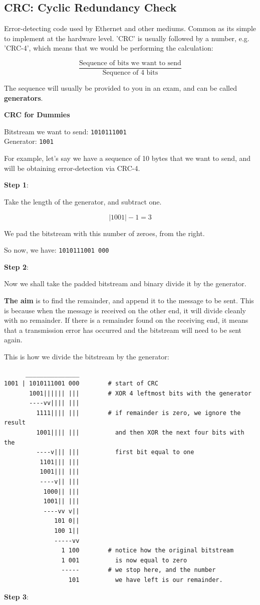 \documentclass{article}
\begin{document}
\subsection{CRC: Cyclic Redundancy Check}

Error-detecting code used by Ethernet and other mediums. Common as its simple to implement at the hardware level. 'CRC' is usually followed by a number, e.g. 'CRC-4', which means that we would be performing the calculation:

\[
\frac{\text{Sequence of bits we want to send}}{\text{Sequence of 4 bits}}
\]

The sequence will usually be provided to you in an exam, and can be called \textbf{generators}.

\newpage
\large\textbf{CRC for Dummies}

Bitstream we want to send: \texttt{1010111001}\\
Generator: \texttt{1001}

For example, let's say we have a sequence of 10 bytes that we want to send, and will be obtaining error-detection via CRC-4.

\textbf{Step 1}:

Take the length of the generator, and subtract one.

\[ |1001| - 1  = 3\]

We pad the bitstream with this number of zeroes, from the right.

So now, we have: \texttt{1010111001 000}

\textbf{Step 2}:

Now we shall take the padded bitstream and binary divide it by the generator.

\textbf{The aim} is to find the remainder, and append it to the message to be sent. This is because when the message
is received on the other end, it will divide cleanly with no remainder. If there is a remainder found on the receiving end, it means that a transmission error has occurred and the bitstream will need to be sent again.

This is how we divide the bitstream by the generator:

\begin{lstlisting}
      _______________
1001 | 1010111001 000        # start of CRC
       1001|||||| |||        # XOR 4 leftmost bits with the generator
       ----vv|||| |||         
         1111|||| |||        # if remainder is zero, we ignore the result
         1001|||| |||          and then XOR the next four bits with the 
         ----v||| |||          first bit equal to one
          1101||| |||
          1001||| |||
          ----v|| |||
           1000|| |||
           1001|| |||
           ----vv v||
              101 0||
              100 1||
              -----vv
                1 100        # notice how the original bitstream
                1 001          is now equal to zero
                -----        # we stop here, and the number 
                  101          we have left is our remainder.
\end{lstlisting}
\filbreak
\textbf{Step 3}:
\end{document}
